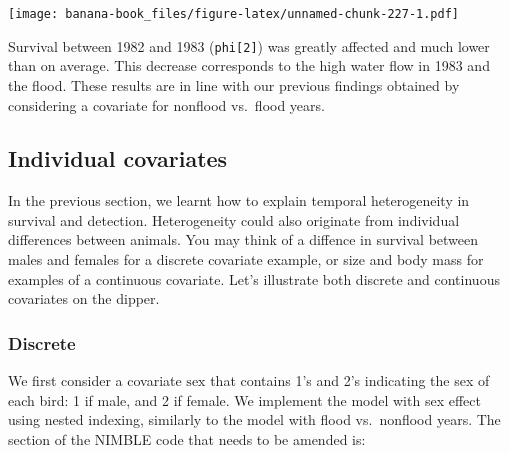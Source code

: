 \documentclass[
  12pt,
]{krantz}
\begin{document}
\texttt{[image: banana-book\_files/figure-latex/unnamed-chunk-227-1.pdf]}

Survival between 1982 and 1983 (\texttt{phi{[}2{]}}) was greatly affected and much lower than on average. This decrease corresponds to the high water flow in 1983 and the flood. These results are in line with our previous findings obtained by considering a covariate for nonflood vs.~flood years.

\hypertarget{individual-covariates}{%
\subsection{Individual covariates}\label{individual-covariates}}

In the previous section, we learnt how to explain temporal heterogeneity in survival and detection. Heterogeneity could also originate from individual differences between animals. You may think of a diffence in survival between males and females for a discrete covariate example, or size and body mass for examples of a continuous covariate. Let's illustrate both discrete and continuous covariates on the dipper.

\hypertarget{discrete-1}{%
\subsubsection{Discrete}\label{discrete-1}}

We first consider a covariate \(\text{sex}\) that contains 1's and 2's indicating the sex of each bird: 1 if male, and 2 if female. We implement the model with sex effect using nested indexing, similarly to the model with flood vs.~nonflood years. The section of the NIMBLE code that needs to be amended is:
\end{document}
